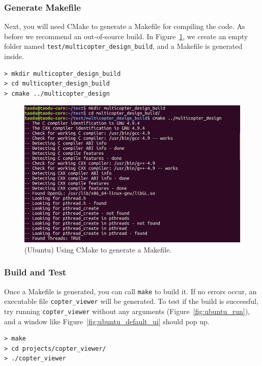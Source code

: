 \subsubsection{Generate Makefile}
Next, you will need CMake to generate a Makefile for compiling the code. As before we recommend an out-of-source build. In Figure~\ref{fig:ubuntu_cmake_code_location}, we create an empty folder named \texttt{test/multicopter\_design\_build}, and a Makefile is generated inside.
\begin{verbatim}
> mkdir multicopter_design_build
> cd multicopter_design_build
> cmake ../multicopter_design
\end{verbatim}

\begin{figure}[!htb]
  \centering
  \includegraphics[width=0.75\linewidth]{ubuntu_cmake_code_location}
  \caption{(Ubuntu) Using CMake to generate a Makefile.}
  \label{fig:ubuntu_cmake_code_location}
\end{figure}

\subsubsection{Build and Test}
Once a Makefile is generated, you can call \texttt{make} to build it. If no errors occur, an executable file \texttt{copter\_viewer} will be generated. To test if the build is successful, try running \texttt{copter\_viewer} without any arguments (Figure~\ref{fig:ubuntu_run}), and a window like Figure~\ref{fig:ubuntu_default_ui} should pop up.
\begin{verbatim}
> make
> cd projects/copter_viewer/
> ./copter_viewer
\end{verbatim}

